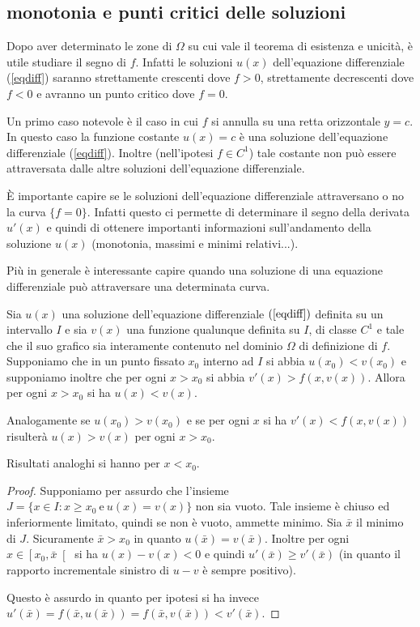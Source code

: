 \subsection{monotonia e punti critici delle soluzioni}

Dopo aver determinato le zone di $\Omega$ su cui vale il teorema di
esistenza e unicità, è utile studiare il segno di $f$. Infatti
le soluzioni $u(x)$ dell'equazione differenziale (\ref{eqdiff})
saranno strettamente crescenti dove $f>0$, strettamente decrescenti
dove $f<0$ e avranno un punto critico dove $f=0$.

Un primo caso notevole è il caso in cui $f$ si annulla su una
retta orizzontale $y=c$.
In questo caso la funzione costante $u(x)=c$ è una
soluzione dell'equazione differenziale (\ref{eqdiff}).
Inoltre
(nell'ipotesi $f\in C^1$) tale costante non può essere
attraversata dalle altre soluzioni dell'equazione differenziale.

\`E importante capire se le soluzioni dell'equazione differenziale
attraversano o no la curva $\{f=0\}$. Infatti questo ci permette di
determinare il segno della derivata $u'(x)$ e quindi di ottenere
importanti informazioni sull'andamento della soluzione $u(x)$
(monotonia, massimi e minimi relativi...).

Più in generale è interessante capire quando una soluzione di una
equazione differenziale può attraversare una determinata curva.

\begin{theorem}\label{nonpassa}
Sia $u(x)$ una soluzione dell'equazione differenziale $(\ref{eqdiff})$
definita su un intervallo $I$ e sia $v(x)$ una funzione qualunque
definita su $I$, di classe $C^1$ e tale che il suo grafico sia
interamente contenuto nel dominio $\Omega$ di definizione di $f$.
Supponiamo che in un punto fissato $x_0$ interno ad $I$ si abbia
$u(x_0)<v(x_0)$ e supponiamo inoltre che per ogni $x>x_0$ si abbia
$v'(x)>f(x,v(x))$. Allora per ogni $x>x_0$ si ha $u(x)<v(x)$.

Analogamente se $u(x_0)>v(x_0)$ e se per ogni $x$ si ha
$v'(x)<f(x,v(x))$ risulterà $u(x)>v(x)$ per ogni $x>x_0$.

Risultati analoghi si hanno per $x<x_0$.
\end{theorem}

\begin{proof}
Supponiamo per assurdo che l'insieme $J=\{x\in I: x\ge x_0\
\mathrm{e}\ u(x)=v(x)\}$ non sia vuoto.
Tale insieme è chiuso ed
inferiormente limitato, quindi se non è vuoto, ammette minimo.
Sia $\bar x$ il minimo di $J$.
Sicuramente $\bar x>x_0$ in quanto $u(\bar
x)=v(\bar x)$.
Inoltre per ogni $x\in \left[x_0,\bar x\right[$ si ha
$u(x)-v(x)<0$ e quindi $u'(\bar x) \ge v'(\bar x)$ (in quanto
il rapporto incrementale sinistro di $u-v$ è sempre positivo).

Questo è assurdo in quanto per ipotesi si ha invece $u'(\bar x) =
f(\bar x, u(\bar x)) = f(\bar x ,v(\bar x)) < v'(\bar x)$.
\end{proof}

